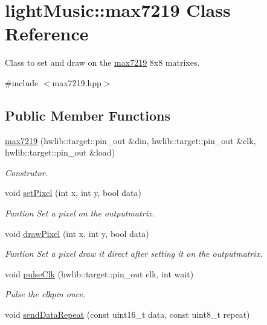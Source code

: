 \hypertarget{classlight_music_1_1max7219}{}\section{light\+Music\+:\+:max7219 Class Reference}
\label{classlight_music_1_1max7219}


Class to set and draw on the \hyperlink{classlight_music_1_1max7219}{max7219} 8x8 matrixes.  




{\ttfamily \#include $<$max7219.\+hpp$>$}

\subsection*{Public Member Functions}
\begin{DoxyCompactItemize}
\item 
\hyperlink{classlight_music_1_1max7219_a46f63fd7ef87caa1372a54d7d0504163}{max7219} (hwlib\+::target\+::pin\+\_\+out \&din, hwlib\+::target\+::pin\+\_\+out \&clk, hwlib\+::target\+::pin\+\_\+out \&load)
\begin{DoxyCompactList}\small\item\em Construtor. \end{DoxyCompactList}\item 
void \hyperlink{classlight_music_1_1max7219_aeebab4f9b18a9a949b2250b1043aeb27}{set\+Pixel} (int x, int y, bool data)
\begin{DoxyCompactList}\small\item\em Funtion Set a pixel on the outputmatrix. \end{DoxyCompactList}\item 
void \hyperlink{classlight_music_1_1max7219_a7173e81fccc1aac88737c7a47304d481}{draw\+Pixel} (int x, int y, bool data)
\begin{DoxyCompactList}\small\item\em Funtion Set a pixel draw it direct after setting it on the outputmatrix. \end{DoxyCompactList}\item 
void \hyperlink{classlight_music_1_1max7219_ac17b41eaeb4f2ff86a8e3c6e325ae183}{pulse\+Clk} (hwlib\+::target\+::pin\+\_\+out clk, int wait)
\begin{DoxyCompactList}\small\item\em Pulse the clkpin once. \end{DoxyCompactList}\item 
void \hyperlink{classlight_music_1_1max7219_a8ae67d8bb04df14a5e97b2c080a3ac06}{send\+Data\+Repeat} (const uint16\+\_\+t data, const uint8\+\_\+t repeat)

\end{DoxyCompactItemize}
